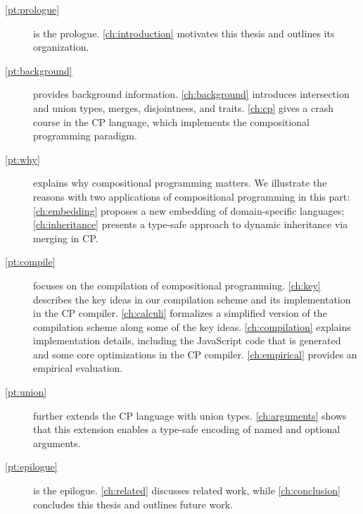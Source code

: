 \begin{description}
\item[\autoref{pt:prologue}] is the prologue. \autoref{ch:introduction}
      motivates this thesis and outlines its organization.
\item[\autoref{pt:background}] provides background information.
      \autoref{ch:background} introduces intersection and union types, merges,
      disjointness, and traits. \autoref{ch:cp} gives a crash course in the CP
      language, which implements the compositional programming paradigm.
\item[\autoref{pt:why}] explains why compositional programming matters. We
      illustrate the reasons with two applications of compositional programming
      in this part: \autoref{ch:embedding} proposes a new embedding of
      domain-specific languages; \autoref{ch:inheritance} presents a type-safe
      approach to dynamic inheritance via merging in CP.
\item[\autoref{pt:compile}] focuses on the compilation of compositional
      programming. \autoref{ch:key} describes the key ideas in our compilation
      scheme and its implementation in the CP compiler. \autoref{ch:calculi}
      formalizes a simplified version of the compilation scheme along some of
      the key ideas. \autoref{ch:compilation} explains implementation details,
      including the JavaScript code that is generated and some core
      optimizations in the CP compiler. \autoref{ch:empirical} provides an
      empirical evaluation.
\item[\autoref{pt:union}] further extends the CP language with union types.
      \autoref{ch:arguments} shows that this extension enables a type-safe
      encoding of named and optional arguments.
\item[\autoref{pt:epilogue}] is the epilogue. \autoref{ch:related} discusses
      related work, while \autoref{ch:conclusion} concludes this thesis and
      outlines future work.
\end{description}

\pagebreak

